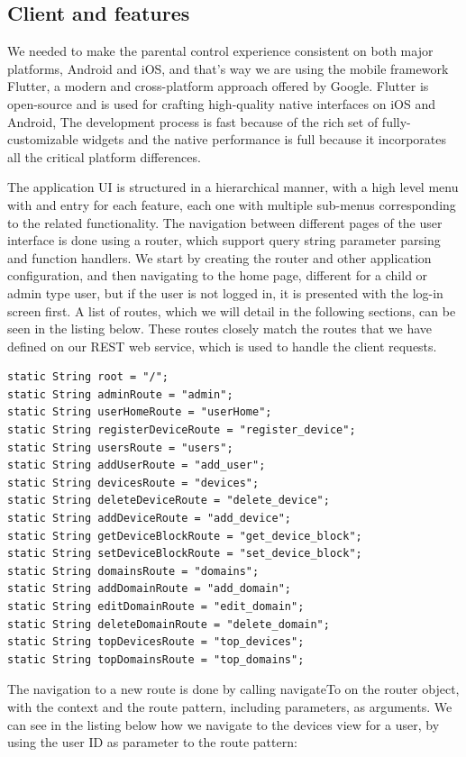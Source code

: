 \subsection{Client and features}

We needed to make the parental control experience consistent on both major platforms, Android and iOS, and that's way we are using the mobile framework Flutter, a modern and cross-platform approach offered by Google. Flutter is open-source and is used for crafting high-quality native interfaces on iOS and Android, The development process is fast because of the rich set of fully-customizable widgets and the native performance is full because it incorporates all the critical platform differences.

The application UI is structured in a hierarchical manner, with a high level menu with and entry for each feature, each one with multiple sub-menus corresponding to the related functionality. The navigation between different pages of the user interface is done using a router, which support query string parameter parsing and function handlers. We start by creating the router and other application configuration, and then navigating to the home page, different for a child or admin type user, but if the user is not logged in, it is presented with the log-in screen first. A list of routes, which we will detail in the following sections, can be seen in the listing below. These routes closely match the routes that we have defined on our REST web service, which is used to handle the client requests.

\begin{lstlisting}
static String root = "/";
static String adminRoute = "admin";
static String userHomeRoute = "userHome";
static String registerDeviceRoute = "register_device";
static String usersRoute = "users";
static String addUserRoute = "add_user";
static String devicesRoute = "devices";
static String deleteDeviceRoute = "delete_device";
static String addDeviceRoute = "add_device";
static String getDeviceBlockRoute = "get_device_block";
static String setDeviceBlockRoute = "set_device_block";
static String domainsRoute = "domains";
static String addDomainRoute = "add_domain";
static String editDomainRoute = "edit_domain";
static String deleteDomainRoute = "delete_domain";
static String topDevicesRoute = "top_devices";
static String topDomainsRoute = "top_domains";
\end{lstlisting}

The navigation to a new route is done by calling navigateTo on the router object, with the context and the route pattern, including parameters, as arguments. We can see in the listing below how we navigate to the devices view for a user, by using the user ID as parameter to the route pattern:

